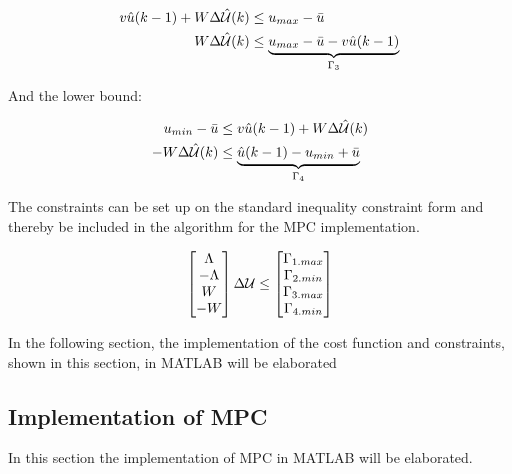  \begin{equation}
 \begin{aligned}
			 	v\hat{u}(k-1)+W \Delta\hat{\CMcal{U}}(k)  &\leq  u_{max} -  \bar{u} \\
				W\Delta\hat{\CMcal{U}}(k)  &\leq  \underbrace{u_{max} -  \bar{u} - v\hat{u}(k-1)}_{\Gamma_3} \\
 \end{aligned}
 \end{equation}



And the lower bound:

 \begin{equation}
 \begin{aligned}
			 	u_{min} -  \bar{u} &\leq v\hat{u}(k-1)+W \Delta\hat{\CMcal{U}}(k) \\
-W\Delta\hat{\CMcal{U}}(k) &\leq \underbrace{\hat{u}(k-1)-u_{min}+\bar{u}}_{\Gamma_4}
 \end{aligned}
 \end{equation}

The constraints can be set up on the standard inequality constraint form and thereby be included in the algorithm for the MPC implementation.

 \begin{equation}
        \begin{bmatrix}
           \Lambda\\
           -\Lambda\\
           W \\
           -W
           \end{bmatrix}
           \Delta\CMcal{U}
           \leq 
           \begin{bmatrix}
         \Gamma_{1.max}\\
         \Gamma_{2.min}\\
         \Gamma_{3.max}\\
         \Gamma_{4.min}

           \end{bmatrix}
 \end{equation}\label{eq:constriants_eq}

 In the following section, the implementation of the cost function and constraints, shown in this section, in MATLAB will be elaborated

\subsection{Implementation of MPC}\label{subse:implementation_mpc}
In this section the implementation of MPC in MATLAB will be elaborated. 

